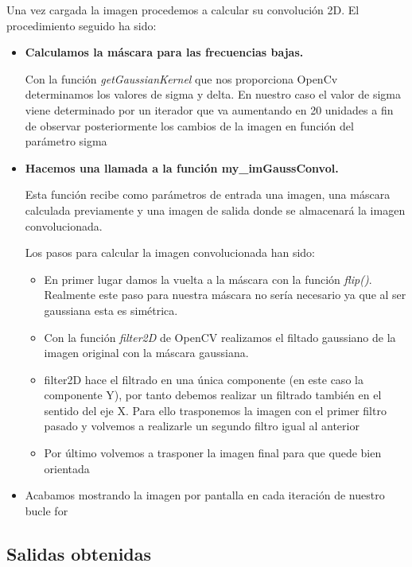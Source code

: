 Una vez cargada la imagen procedemos a calcular su convolución 2D. El procedimiento seguido ha sido:

\begin{itemize}
  \item \textbf{Calculamos la máscara para las frecuencias bajas.}
  
  Con la función \textit{getGaussianKernel} que nos proporciona OpenCv determinamos los valores de sigma y delta. En nuestro caso el valor de sigma viene determinado por un iterador que va aumentando en 20 unidades a fin de observar posteriormente los cambios de la imagen en función del parámetro sigma
  
  \item\textbf{ Hacemos una llamada a la función my\_imGaussConvol.}
  
  Esta función recibe como parámetros de entrada una imagen, una máscara calculada previamente y una imagen de salida donde se almacenará la imagen convolucionada.
  
  Los pasos para calcular la imagen convolucionada han sido:
  
  \begin{itemize}
  	\item En primer lugar damos la vuelta a la máscara con la función \textit{flip()}. Realmente este paso para nuestra máscara no sería necesario ya que al ser gaussiana esta es simétrica.
  	
  	\item Con la función \textit{filter2D} de OpenCV realizamos el filtado gaussiano de la imagen original con la máscara gaussiana.
  	
  	\item filter2D hace el filtrado en una única componente (en este caso la componente Y), por tanto debemos realizar un filtrado también en el sentido del eje X. Para ello trasponemos la imagen con el primer filtro pasado y volvemos a realizarle un segundo filtro igual al anterior
  	
  	\item Por último volvemos a trasponer la imagen final para que quede bien orientada
  \end{itemize}
  
  \item Acabamos mostrando la imagen por pantalla en cada iteración de nuestro bucle for
  
  
\end{itemize}

\subsection{Salidas obtenidas}

